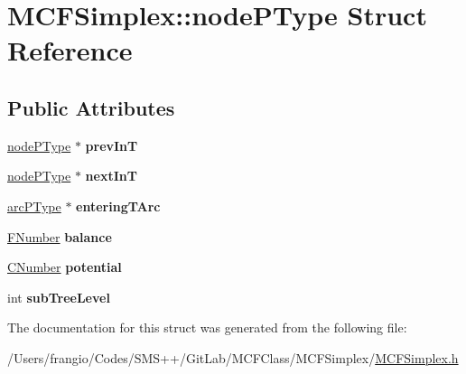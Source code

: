 \hypertarget{struct_m_c_f_simplex_1_1node_p_type}{}\section{M\+C\+F\+Simplex\+:\+:node\+P\+Type Struct Reference}
\label{struct_m_c_f_simplex_1_1node_p_type}
\subsection*{Public Attributes}
\begin{DoxyCompactItemize}
\item 
\mbox{\label{struct_m_c_f_simplex_1_1node_p_type_a2c4621d38073f48e4a7017fbac3ac272}} 
\mbox{\hyperlink{struct_m_c_f_simplex_1_1node_p_type}{node\+P\+Type}} $\ast$ {\bfseries prev\+InT}
\item 
\mbox{\label{struct_m_c_f_simplex_1_1node_p_type_afacca29d7443da6d2eb6584326bce699}} 
\mbox{\hyperlink{struct_m_c_f_simplex_1_1node_p_type}{node\+P\+Type}} $\ast$ {\bfseries next\+InT}
\item 
\mbox{\label{struct_m_c_f_simplex_1_1node_p_type_a8c63b8bd1f3dee4aba1c5071d05e66b4}} 
\mbox{\hyperlink{struct_m_c_f_simplex_1_1arc_p_type}{arc\+P\+Type}} $\ast$ {\bfseries entering\+T\+Arc}
\item 
\mbox{\label{struct_m_c_f_simplex_1_1node_p_type_a6c8c2329e47ec72e395bc8229b4814d6}} 
\mbox{\hyperlink{class_m_c_f_class_aeea3e5951d222b2a8e57de1b4246a909}{F\+Number}} {\bfseries balance}
\item 
\mbox{\label{struct_m_c_f_simplex_1_1node_p_type_a019c07ef3ab5e1a2615f5857559aae5b}} 
\mbox{\hyperlink{class_m_c_f_class_a24d0627ba8213afe1ec4ebeb4508e8f1}{C\+Number}} {\bfseries potential}
\item 
\mbox{\label{struct_m_c_f_simplex_1_1node_p_type_a695254eca5f8f2320a88dc6ee76509e0}} 
int {\bfseries sub\+Tree\+Level}
\end{DoxyCompactItemize}


The documentation for this struct was generated from the following file\+:\begin{DoxyCompactItemize}
\item 
/\+Users/frangio/\+Codes/\+S\+M\+S++/\+Git\+Lab/\+M\+C\+F\+Class/\+M\+C\+F\+Simplex/\mbox{\hyperlink{_m_c_f_simplex_8h}{M\+C\+F\+Simplex.\+h}}\end{DoxyCompactItemize}
